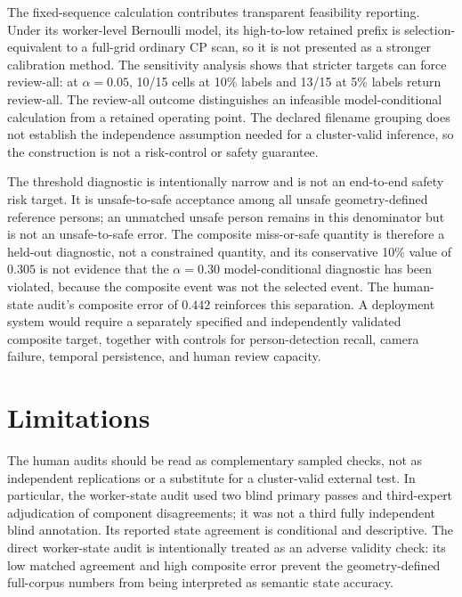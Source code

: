 \documentclass[iicol,pdflatex,sn-mathphys-num]{sn-jnl}
\begin{document}
The fixed-sequence calculation contributes transparent feasibility reporting. Under its worker-level Bernoulli model, its high-to-low retained prefix is selection-equivalent to a full-grid ordinary CP scan, so it is not presented as a stronger calibration method. The sensitivity analysis shows that stricter targets can force review-all: at $\alpha=0.05$, 10/15 cells at 10\% labels and 13/15 at 5\% labels return review-all. The review-all outcome distinguishes an infeasible model-conditional calculation from a retained operating point. The declared filename grouping does not establish the independence assumption needed for a cluster-valid inference, so the construction is not a risk-control or safety guarantee.

The threshold diagnostic is intentionally narrow and is not an end-to-end safety risk target. It is unsafe-to-safe acceptance among all unsafe geometry-defined reference persons; an unmatched unsafe person remains in this denominator but is not an unsafe-to-safe error. The composite miss-or-safe quantity is therefore a held-out diagnostic, not a constrained quantity, and its conservative 10\% value of $0.305$ is not evidence that the $\alpha=0.30$ model-conditional diagnostic has been violated, because the composite event was not the selected event. The human-state audit's composite error of $0.442$ reinforces this separation. A deployment system would require a separately specified and independently validated composite target, together with controls for person-detection recall, camera failure, temporal persistence, and human review capacity.

\section{Limitations}\label{sec:limitations}

The human audits should be read as complementary sampled checks, not as independent replications or a substitute for a cluster-valid external test. In particular, the worker-state audit used two blind primary passes and third-expert adjudication of component disagreements; it was not a third fully independent blind annotation. Its reported state agreement is conditional and descriptive. The direct worker-state audit is intentionally treated as an adverse validity check: its low matched agreement and high composite error prevent the geometry-defined full-corpus numbers from being interpreted as semantic state accuracy.
\end{document}
